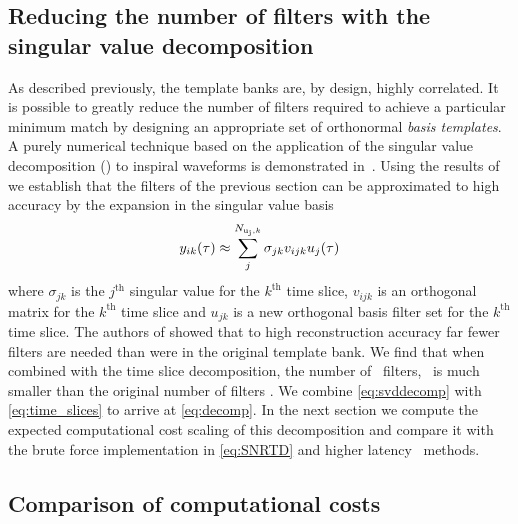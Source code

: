 \subsection{Reducing the number of filters with the singular value
decomposition}

As described previously, the template banks are, by design, highly correlated.
It is possible to greatly reduce the number of filters required to achieve a
particular minimum match by designing an appropriate set of orthonormal {\em
basis templates}.  A purely numerical technique based on the application of the
singular value decomposition (\SVD) to inspiral waveforms is demonstrated
in~\cite{Cannon:2010p10398}.  Using the results of ~\cite{Cannon:2010p10398} we
establish that the filters of the previous section can be approximated to high
accuracy by the expansion in the singular value basis
%
\begin{equation}
y_{ik}(\tau) \approx \sum_j^{N_{\mathrm{u_j},k}} \sigma_{jk} v_{ijk} u_{j}(\tau)
\label{eq:svddecomp}
\end{equation}
%
where $\sigma_{jk}$ is the $j^{\mathrm{th}}$ singular value for the
$k^{\mathrm{th}}$ time slice, $v_{ijk}$ is an orthogonal matrix for the
$k^{\mathrm{th}}$ time slice  and $u_{jk}$ is a new orthogonal basis filter set
for the $k^{\mathrm{th}}$ time slice.  The authors of \cite{Cannon:2010p10398}
showed that to high reconstruction accuracy far fewer filters are needed than
were in the original template bank. We find that when combined with the time
slice decomposition, the number of \SVD\ filters, \numsvdtmps\ is much smaller
than the original number of filters \numtmps.  We combine \eqref{eq:svddecomp}
with \eqref{eq:time_slices} to arrive at \eqref{eq:decomp}.  In the next
section we compute the expected computational cost scaling of this
decomposition and compare it with the brute force implementation in
\eqref{eq:SNRTD} and higher latency \fft\ methods.

\subsection{Comparison of computational costs}

